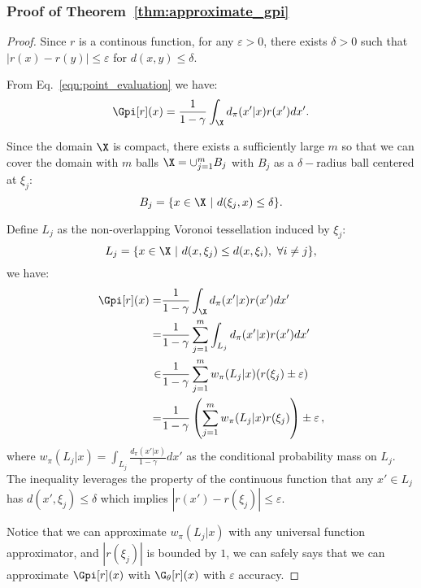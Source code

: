 \subsubsection{Proof of Theorem~\ref{thm:approximate_gpi}}
\begin{proof}
Since $r$ is a continous function, for any $\varepsilon > 0$, there exists $\delta > 0$ such that 
$|r(x) - r(y)|\leq \varepsilon$ for $d(x,y)\leq \delta$.

From Eq.~\eqref{eqn:point_evaluation} we have: 
$$\Gpi[r](x) = \frac{1}{1-\gamma}\int_{\X}d_\pi(x'|x)r(x')dx'.$$

Since the domain $\X$ is compact, there exists a sufficiently large $m$ so that we can cover the domain with $m$ balls $\X = \cup_{j=1}^m B_j$ with $B_j$ as a $\delta-$radius ball centered at $\xi_j$:
$$
B_j = \{x\in \X~|~d(\xi_j,x)\leq \delta\}.
$$

Define $L_j$ as the non-overlapping Voronoi tessellation induced by $\xi_j$:
$$
L_j = \{x\in \X~|~ d(x,\xi_j) \leq d(x,\xi_i),~\forall i\neq j\},
$$
we have:
\begin{align*}
    \Gpi[r](x) =& \frac{1}{1-\gamma}\int_{\X}d_\pi(x'|x)r(x')dx' \\
    =& \frac{1}{1-\gamma}\sum_{j=1}^m \int_{L_j} d_\pi(x'|x) r(x') dx' \\
    \in& \frac{1}{1-\gamma}\sum_{j=1}^m w_\pi(L_j|x) (r(\xi_j) \pm \varepsilon) \\
    =& \frac{1}{1-\gamma}\left(\sum_{j=1}^m w_\pi(L_j|x) r(\xi_j)\right) \pm \varepsilon\,,
\end{align*}
where $w_\pi(L_j|x) = \int_{L_j} \frac{d_\pi(x'|x)}{1-\gamma} dx'$ as the conditional probability mass on $L_j$. The inequality leverages the property of the continuous function that any $x'\in L_j$ has $d(x',\xi_j)\leq \delta$ which implies $|r(x') - r(\xi_j)| \leq \varepsilon$.

Notice that we can approximate $w_\pi(L_j|x)$ with any universal function approximator, and $|r(\xi_j)|$ is bounded by $1$, we can safely says that we can approximate $\Gpi[r](x)$ with $\G_\theta[r](x)$ with $\varepsilon$ accuracy.
\end{proof}

